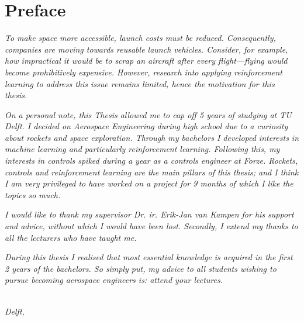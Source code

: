 \chapter*{Preface}

\emph{To make space more accessible, launch costs must be reduced. Consequently, companies are moving towards reusable launch vehicles. Consider, for example, how impractical it would be to scrap an aircraft after every flight—flying would become prohibitively expensive. However, research into applying reinforcement learning to address this issue remains limited, hence the motivation for this thesis.
}

\emph{On a personal note, this Thesis allowed me to cap off 5 years of studying at TU Delft. I decided on Aerospace Engineering during high school due to a curiosity about rockets and space exploration. Through my bachelors I developed interests in machine learning and particularly reinforcement learning. Following this, my interests in controls spiked during a year as a controls engineer at Forze. Rockets, controls and reinforcement learning are the main pillars of this thesis; and I think I am very privileged to have worked on a project for 9 months of which I like the topics so much.
}

\emph{I would like to thank my supervisor Dr. ir. Erik-Jan van Kampen for his support and advice, without which I would have been lost. Secondly, I extend my thanks to all the lecturers who have taught me.}

\emph{During this thesis I realised that most essential knowledge is acquired in the first 2 years of the bachelors. So simply put, my advice to all students wishing to pursue becoming aerospace engineers is: attend your lectures.
}

\begin{flushright}
{\makeatletter\itshape
    \@author \\
    Delft, \monthname{} \the\year{}
\makeatother}
\end{flushright}